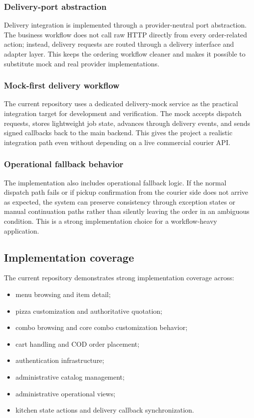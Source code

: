 \subsubsection{Delivery-port abstraction}

Delivery integration is implemented through a provider-neutral port abstraction. The business workflow does not call raw HTTP directly from every order-related action; instead, delivery requests are routed through a delivery interface and adapter layer. This keeps the ordering workflow cleaner and makes it possible to substitute mock and real provider implementations.

\subsubsection{Mock-first delivery workflow}

The current repository uses a dedicated delivery-mock service as the practical integration target for development and verification. The mock accepts dispatch requests, stores lightweight job state, advances through delivery events, and sends signed callbacks back to the main backend. This gives the project a realistic integration path even without depending on a live commercial courier API.

\subsubsection{Operational fallback behavior}

The implementation also includes operational fallback logic. If the normal dispatch path fails or if pickup confirmation from the courier side does not arrive as expected, the system can preserve consistency through exception states or manual continuation paths rather than silently leaving the order in an ambiguous condition. This is a strong implementation choice for a workflow-heavy application.

\subsection{Implementation coverage}

The current repository demonstrates strong implementation coverage across:

\begin{itemize}
    \item menu browsing and item detail;
    \item pizza customization and authoritative quotation;
    \item combo browsing and core combo customization behavior;
    \item cart handling and COD order placement;
    \item authentication infrastructure;
    \item administrative catalog management;
    \item administrative operational views;
    \item kitchen state actions and delivery callback synchronization.
\end{itemize}
